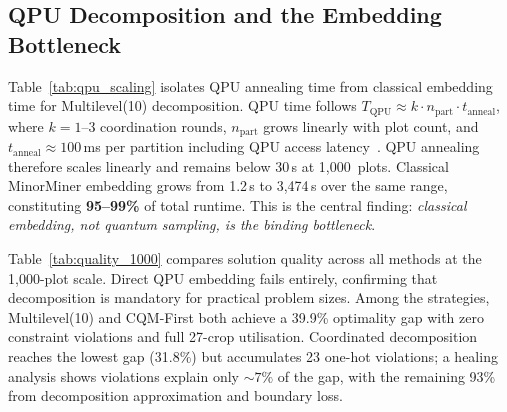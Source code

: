 \documentclass[conference]{IEEEtran}
\begin{document}
\subsection{QPU Decomposition and the Embedding Bottleneck}
\label{subsec:qpu}

Table~\ref{tab:qpu_scaling} isolates QPU annealing time from classical embedding time for Multilevel(10) decomposition.
QPU time follows $T_{\text{QPU}} \approx k \cdot n_{\text{part}} \cdot t_{\text{anneal}}$, where $k{=}1$--$3$ coordination rounds, $n_{\text{part}}$ grows linearly with plot count, and $t_{\text{anneal}}{\approx}100$\,ms per partition including QPU access latency~\cite{pelofske2021parallel, marshall2019power}.
QPU annealing therefore scales linearly and remains below 30\,s at 1{,}000~plots.
Classical MinorMiner embedding grows from 1.2\,s to 3{,}474\,s over the same range, constituting \textbf{95--99\%} of total runtime.
This is the central finding: \emph{classical embedding, not quantum sampling, is the binding bottleneck}.

\begin{table}[t]
\centering
\caption{QPU time vs.\ classical embedding time (Multilevel(10)).}
\label{tab:qpu_scaling}
\footnotesize
{}
\end{table}

Table~\ref{tab:quality_1000} compares solution quality across all methods at the 1{,}000-plot scale.
Direct QPU embedding fails entirely, confirming that decomposition is mandatory for practical problem sizes.
Among the strategies, Multilevel(10) and CQM-First both achieve a 39.9\% optimality gap with zero constraint violations and full 27-crop utilisation.
Coordinated decomposition reaches the lowest gap (31.8\%) but accumulates 23 one-hot violations; a healing analysis shows violations explain only ${\sim}7\%$ of the gap, with the remaining 93\% from decomposition approximation and boundary loss.
\end{document}

